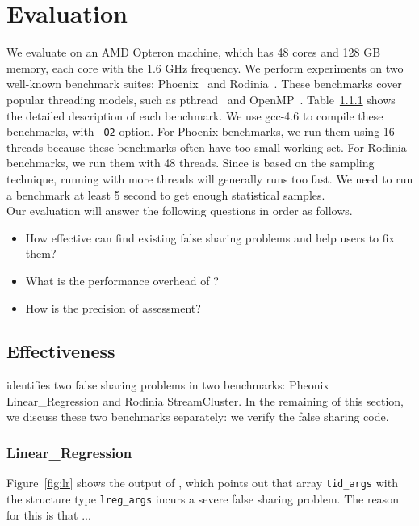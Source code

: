 \section{Evaluation}
\label{sec:eval}

We evaluate \cheetah{} on an AMD Opteron machine, which has 48 cores and 128 GB memory, each core with the 1.6 GHz frequency. We perform experiments on two well-known benchmark suites: Phoenix~\cite{} and Rodinia~\cite{}. These benchmarks cover popular threading models, such as pthread~\cite{} and OpenMP~\cite{}. Table~\ref{} shows the detailed description of each benchmark. We use gcc-4.6 to compile these benchmarks, with {\tt -O2} option. For Phoenix benchmarks, we run them using 16 threads because these benchmarks often have too small working set. For Rodinia benchmarks, we run them with 48 threads. Since \cheetah{} is based on the sampling technique, running with more threads will generally runs too fast. We need to run a benchmark at least 5 second to get enough statistical samples. \\

\sloppy{}
Our evaluation will answer the following questions in order as follows. 

\begin{itemize}
\item How effective can \cheetah{} find existing false sharing problems and help users to fix them? 

\item What is the performance overhead of \cheetah{}? 

\item How is the precision of assessment? 

\end{itemize}

\subsection{Effectiveness}

\cheetah{} identifies two false sharing problems in two benchmarks: Pheonix Linear\_Regression and Rodinia StreamCluster. In the remaining of this section, we discuss these two benchmarks separately: we verify the false sharing code. 

\subsubsection{Linear\_Regression}
Figure~\ref{fig:lr} shows the output of \cheetah{}, which points out that array {\tt tid\_args} with the structure type {\tt lreg\_args} incurs a severe false sharing problem. The reason for this is that ...

